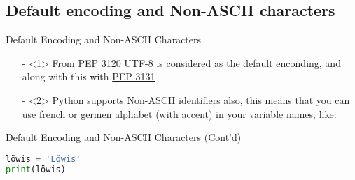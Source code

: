 \subsection{Default encoding and Non-ASCII characters}
\begin{frame}{Default Encoding and Non-ASCII Characters}
\begin{itemize}
\item[-]<1>
From \href{https://peps.python.org/pep-3120/}{PEP 3120} UTF-8 is considered as the default enconding, and along with this with \href{https://peps.python.org/pep-3131/}{PEP 3131}

\item[-]<2>
Python supports Non-ASCII identifiers also, this means that you can use french or germen alphabet
(with accent) in your variable names, like:
\end{itemize}
\end{frame}

\begin{frame}[fragile]{Default Encoding and Non-ASCII Characters (Cont'd)}
\begin{lstlisting}[language=python, keywordstyle=\color{Mulberry}\textbf]
löwis = 'Löwis'
print(löwis)
\end{lstlisting}
\end{frame}
